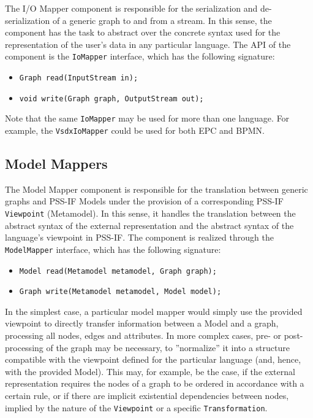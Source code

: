 The I/O Mapper component is responsible for the serialization and de-serialization of a generic graph to and from a stream. In this sense, the component has the task to abstract over the concrete syntax used for the representation of the user's data in any particular language. The API of the component is the \texttt{IoMapper} interface, which has the following signature:

\begin{itemize}
\item \texttt{Graph read(InputStream in);}
\item \texttt{void write(Graph graph, OutputStream out);}
\end{itemize}

Note that the same \texttt{IoMapper} may be used for more than one language. For example, the \texttt{VsdxIoMapper} could be used for both EPC and BPMN.

\subsection{Model Mappers}
\label{sec:impl:comp:model}

The Model Mapper component is responsible for the translation between generic graphs and PSS-IF Models under the provision of a corresponding PSS-IF \texttt{Viewpoint} (Metamodel). In this sense, it handles the translation between the abstract syntax of the external representation and the abstract syntax of the language's viewpoint in PSS-IF. The component is realized through the \texttt{ModelMapper} interface, which has the following signature:

\begin{itemize}
\item \texttt{Model read(Metamodel metamodel, Graph graph);}
\item \texttt{Graph write(Metamodel metamodel, Model model);}
\end{itemize}

In the simplest case, a particular model mapper would simply use the provided viewpoint to directly transfer information between a Model and a graph, processing all nodes, edges and attributes. In more complex cases, pre- or post-processing of the graph may be necessary, to ''normalize'' it into a structure compatible with the viewpoint defined for the particular language (and, hence, with the provided Model). This may, for example, be the case, if the external representation requires the nodes of a graph to be ordered in accordance with a certain rule, or if there are implicit existential dependencies between nodes, implied by the nature of the \texttt{Viewpoint} or a specific \texttt{Transformation}.

